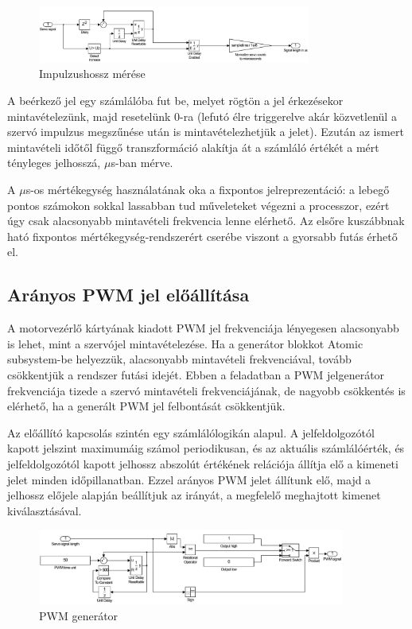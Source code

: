 \begin{figure}[H]
	\centering
	\includegraphics[width=0.8\textwidth]{fig/lengthdetector}
	\caption{Impulzushossz mérése}
	\label{fig:lengthdetector}
\end{figure}

A beérkező jel egy számlálóba fut be, melyet rögtön a jel érkezésekor mintavételezünk, majd resetelünk 0-ra (lefutó élre triggerelve akár közvetlenül a szervó impulzus megszűnése után is mintavételezhetjük a jelet). Ezután az ismert mintavételi időtől függő transzformáció alakítja át a számláló értékét a mért tényleges jelhosszá, $\mu$s-ban mérve.

A $\mu$s-os mértékegység használatának oka a fixpontos jelreprezentáció: a lebegő pontos számokon sokkal lassabban tud műveleteket végezni a processzor\cite[Chap.~28]{dspbook}, ezért úgy csak alacsonyabb mintavételi frekvencia lenne elérhető. Az elsőre kuszábbnak ható fixpontos mértékegység-rendszerért cserébe viszont a gyorsabb futás érhető el.

\subsection{Arányos PWM jel előállítása}

A motorvezérlő kártyának kiadott PWM jel frekvenciája lényegesen alacsonyabb is lehet, mint a szervójel mintavételezése. Ha a generátor blokkot Atomic subsystem-be helyezzük, alacsonyabb mintavételi frekvenciával, tovább csökkentjük a rendszer futási idejét. Ebben a feladatban a PWM jelgenerátor frekvenciája tizede a szervó mintavételi frekvenciájának, de nagyobb csökkentés is elérhető, ha a generált PWM jel felbontását csökkentjük.

Az előállító kapcsolás szintén egy számlálólogikán alapul. A jelfeldolgozótól kapott jelszint maximumáig számol periodikusan, és az aktuális számlálóérték, és jelfeldolgozótól kapott jelhossz abszolút értékének relációja állítja elő a kimeneti jelet minden időpillanatban. Ezzel arányos PWM jelet állítunk elő, majd a jelhossz előjele alapján beállítjuk az irányát, a megfelelő meghajtott kimenet kiválasztásával.

\begin{figure}[H]
	\centering
	\includegraphics[width=0.9\textwidth]{fig/pwmgenerator}
	\caption{PWM generátor}
	\label{fig:pwmgenerator}
\end{figure}

